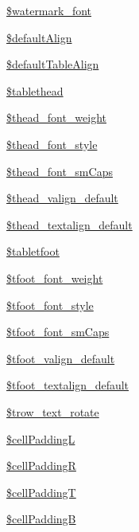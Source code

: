 \begin{DoxyCompactItemize}
\hyperlink{classm_p_d_f_a141a9e9d63dc5c99ccc87ffe9c788456}{\$watermark\-\_\-font}
\item 
\hyperlink{classm_p_d_f_a86d7b3f5efa4b477e5214a95e820a24b}{\$default\-Align}
\item 
\hyperlink{classm_p_d_f_a64c32a13df3e9124bb0d78226e5fce35}{\$default\-Table\-Align}
\item 
\hyperlink{classm_p_d_f_a34b7a7d409b4028619dc655e8c61dac5}{\$tablethead}
\item 
\hyperlink{classm_p_d_f_a31de59e45d7543c5bf2b03a8eeab5a59}{\$thead\-\_\-font\-\_\-weight}
\item 
\hyperlink{classm_p_d_f_a1058a117e29a40277f51e25a911b76ed}{\$thead\-\_\-font\-\_\-style}
\item 
\hyperlink{classm_p_d_f_a656bba9dbf70fbd5e07f2286124c5661}{\$thead\-\_\-font\-\_\-sm\-Caps}
\item 
\hyperlink{classm_p_d_f_ae0b93c4a3d049f581421f2a102054fed}{\$thead\-\_\-valign\-\_\-default}
\item 
\hyperlink{classm_p_d_f_a0c1be122e2c523840017c67a7f30a6af}{\$thead\-\_\-textalign\-\_\-default}
\item 
\hyperlink{classm_p_d_f_a045e73d3a265fe937444a3f05e10f7cc}{\$tabletfoot}
\item 
\hyperlink{classm_p_d_f_a223ec9b10bc4f523453f82c7cc2ccd31}{\$tfoot\-\_\-font\-\_\-weight}
\item 
\hyperlink{classm_p_d_f_a398b1db342ce6031d20a3987a8479239}{\$tfoot\-\_\-font\-\_\-style}
\item 
\hyperlink{classm_p_d_f_a4ab435435993637d08ba8eea25d0346f}{\$tfoot\-\_\-font\-\_\-sm\-Caps}
\item 
\hyperlink{classm_p_d_f_ab0d09240035a20463865802bf0bea5a5}{\$tfoot\-\_\-valign\-\_\-default}
\item 
\hyperlink{classm_p_d_f_adeb6ac63358951b4ee1f5060d939bf07}{\$tfoot\-\_\-textalign\-\_\-default}
\item 
\hyperlink{classm_p_d_f_a6e98c22b61b2584f3a10121b0282673b}{\$trow\-\_\-text\-\_\-rotate}
\item 
\hyperlink{classm_p_d_f_ac8139121aec5ed7643ca1b773451a3bb}{\$cell\-Padding\-L}
\item 
\hyperlink{classm_p_d_f_ae70ff08f2a7aca283fc90729e53195ff}{\$cell\-Padding\-R}
\item 
\hyperlink{classm_p_d_f_a02dbdc3f877989f2d9d43e4799151e58}{\$cell\-Padding\-T}
\item 
\hyperlink{classm_p_d_f_a5b604343e40ec0c4d7852188f441b065}{\$cell\-Padding\-B}

\end{DoxyCompactItemize}
